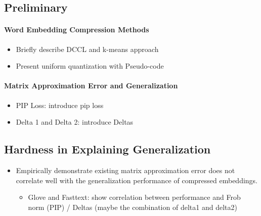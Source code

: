 \subsection{Preliminary}
\label{subsec:prel}
\paragraph{Word Embedding Compression Methods}
\begin{itemize}
	\item Briefly describe DCCL and k-means approach
	\item Present uniform quantization with Pseudo-code
\end{itemize}

\paragraph{Matrix Approximation Error and Generalization}
	\begin{itemize}
		\item PIP Loss: introduce pip loss
		\item Delta 1 and Delta 2: introduce Deltas
	\end{itemize}
	
\subsection{Hardness in Explaining Generalization}
\label{subsec:hard_explain}
	\begin{itemize}
		\item Empirically demonstrate existing matrix approximation error does not correlate well with the generalization performance of compressed embeddings.
		\begin{itemize}
			\item Glove and Fasttext: show correlation between performance and Frob norm (PIP) / Deltas (maybe the combination of delta1 and delta2) 
		\end{itemize}
	\end{itemize}